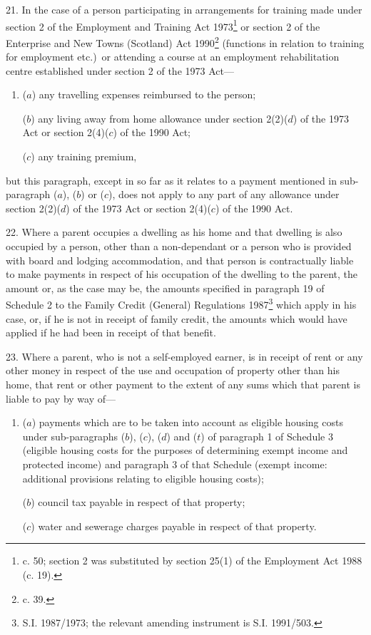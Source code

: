 \documentclass[a4paper]{article}
\begin{document}
\medskip

21.  In the case of a person participating in arrangements for training made under section 2 of the Employment and Training Act 1973\footnote{ c. 50; section 2 was substituted by section 25(1) of the Employment Act 1988 (c. 19).} or section 2 of the Enterprise and New Towns (Scotland) Act 1990\footnote{ c. 39.} (functions in relation to training for employment etc.)\ or attending a course at an employment rehabilitation centre established under section 2 of the 1973 Act—
\begin{enumerate}\item[]
($a$) any travelling expenses reimbursed to the person;

($b$) any living away from home allowance under section 2(2)($d$) of the 1973 Act or section 2(4)($c$) of the 1990 Act;

($c$) any training premium,
\end{enumerate}
but this paragraph, except in so far as it relates to a payment mentioned in sub-paragraph ($a$), ($b$) or ($c$), does not apply to any part of any allowance under section 2(2)($d$) of the 1973 Act or section 2(4)($c$) of the 1990 Act.

\medskip

22.  Where a parent occupies a dwelling as his home and that dwelling is also occupied by a person, other than a non-dependant or a person who is provided with board and lodging accommodation, and that person is contractually liable to make payments in respect of his occupation of the dwelling to the parent, the amount or, as the case may be, the amounts specified in paragraph 19 of Schedule 2 to the Family Credit (General) Regulations 1987\footnote{\frenchspacing S.I. 1987/1973; the relevant amending instrument is S.I. 1991/503.} which apply in his case, or, if he is not in receipt of family credit, the amounts which would have applied if he had been in receipt of that benefit.

\medskip

23.  Where a parent, who is not a self-employed earner, is in receipt of rent or any other money in respect of the use and occupation of property other than his home, that rent or other payment to the extent of any sums which that parent is liable to pay by way of—
\begin{enumerate}\item[]
($a$) payments which are to be taken into account as eligible housing costs under sub-paragraphs ($b$), ($c$), ($d$) and ($t$) of paragraph 1 of Schedule 3 (eligible housing costs for the purposes of determining exempt income and protected income) and paragraph 3 of that Schedule (exempt income: additional provisions relating to eligible housing costs);

($b$) council tax payable in respect of that property;

($c$) water and sewerage charges payable in respect of that property.
\end{enumerate}
\end{document}
